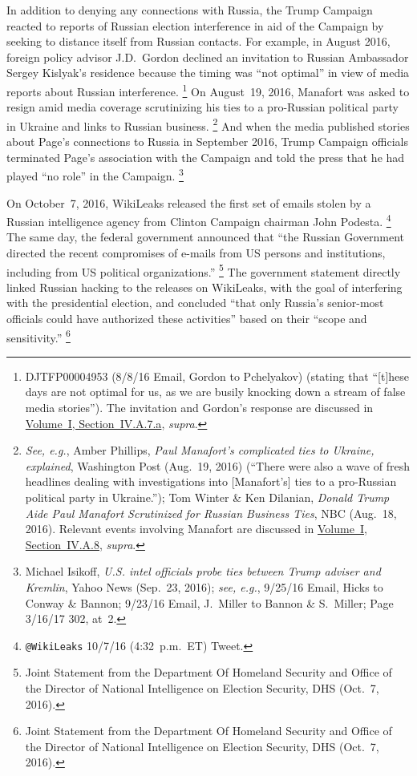In addition to denying any connections with Russia, the Trump Campaign reacted to reports of Russian election interference in aid of the Campaign by seeking to distance itself from Russian contacts.
For example, in August 2016, foreign policy advisor J.D.~Gordon declined an invitation to Russian Ambassador Sergey Kislyak's residence because the timing was ``not optimal'' in view of media reports about Russian interference.%
\footnote{DJTFP00004953 (8/8/16 Email, Gordon to Pchelyakov) (stating that ``[t]hese days are not optimal for us, as we are busily knocking down a stream of false media stories'').
The invitation and Gordon's response are discussed in \hyperlink{paragraph.1.4.1.7.1}{Volume~I, Section~IV.A.7.a}, \textit{supra}.}
On August~19, 2016, Manafort was asked to resign amid media coverage scrutinizing his ties to a pro-Russian political party in Ukraine and links to Russian business.%
\footnote{\textit{See, e.g.}, Amber Phillips, \textit{Paul Manafort's complicated ties to Ukraine, explained}, Washington Post (Aug.~19, 2016) (``There were also a wave of fresh headlines dealing with investigations into [Manafort's] ties to a pro-Russian political party in Ukraine.'');
Tom Winter \& Ken Dilanian, \textit{Donald Trump Aide Paul Manafort Scrutinized for Russian Business Ties}, NBC (Aug.~18, 2016).
Relevant events involving Manafort are discussed in \hyperlink{subsubsection.1.4.1.8}{Volume~I, Section~IV.A.8}, \textit{supra}.}
And when the media published stories about Page's connections to Russia in September 2016, Trump Campaign officials terminated Page's association with the Campaign and told the press that he had played ``no role'' in the Campaign.%
\footnote{Michael Isikoff, \textit{U.S. intel officials probe ties between Trump adviser and Kremlin}, Yahoo News (Sep.~23, 2016);
\textit{see, e.g.}, 9/25/16 Email, Hicks to Conway \& Bannon;
9/23/16 Email, J.~Miller to Bannon \& S.~Miller;
Page 3/16/17 302, at~2.}

On October~7, 2016, WikiLeaks released the first set of emails stolen by a Russian intelligence agency from Clinton Campaign chairman John Podesta.%
\footnote{\verb+@WikiLeaks+ 10/7/16 (4:32~p.m.~ET) Tweet.}
The same day, the federal government announced that ``the Russian Government directed the recent compromises of e-mails from US persons and institutions, including from US political organizations.''%
\footnote{Joint Statement from the Department Of Homeland Security and Office of the Director of National Intelligence on Election Security, DHS (Oct.~7, 2016).}
The government statement directly linked Russian hacking to the releases on WikiLeaks, with the goal of interfering with the presidential election, and concluded ``that only Russia's senior-most officials could have authorized these activities'' based on their ``scope and sensitivity.''%
\footnote{Joint Statement from the Department Of Homeland Security and Office of the Director of National Intelligence on Election Security, DHS (Oct.~7, 2016).}

